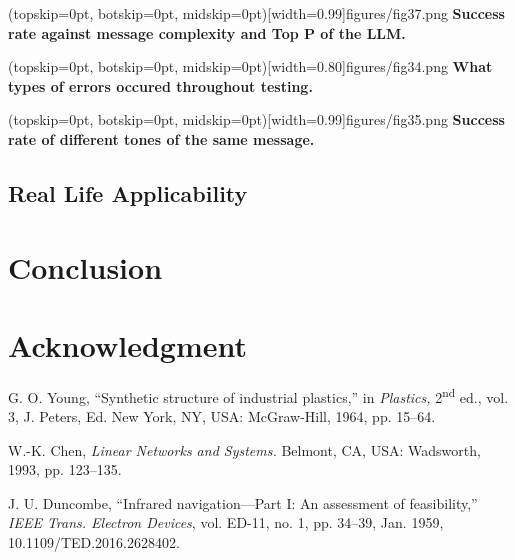 \documentclass{ieeeaccess}
\begin{document}
\Figure[t!](topskip=0pt, botskip=0pt,
midskip=0pt)[width=0.99\columnwidth]{{figures/fig37.png}}
{ \textbf{Success rate against message complexity and Top P of the LLM.}\label{fig11}}

\Figure[t!](topskip=0pt, botskip=0pt,
midskip=0pt)[width=0.80\columnwidth]{{figures/fig34.png}}
{ \textbf{What types of errors occured throughout testing.}\label{fig12}}

\Figure[t!](topskip=0pt, botskip=0pt,
midskip=0pt)[width=0.99\columnwidth]{{figures/fig35.png}}
{ \textbf{Success rate of different tones of the same message.}\label{fig13}}


\subsection{Real Life Applicability}

\section{Conclusion}


\section*{Acknowledgment}


\begin{thebibliography}{00}

     G. O. Young, ``Synthetic structure of industrial plastics,''
    in \emph{Plastics,} 2\textsuperscript{nd} ed., vol. 3, J. Peters, Ed. New York,
    NY, USA: McGraw-Hill, 1964, pp. 15--64.

     W.-K. Chen, \emph{Linear Networks and Systems.} Belmont, CA,
    USA: Wadsworth, 1993, pp. 123--135.

     J. U. Duncombe, ``Infrared navigation---Part I: An assessment
    of feasibility,'' \emph{IEEE Trans. Electron Devices}, vol. ED-11, no. 1, pp.
    34--39, Jan. 1959, 10.1109/TED.2016.2628402.


\end{thebibliography}
\end{document}
